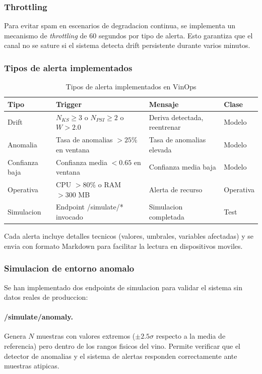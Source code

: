\subsubsection{Throttling}

Para evitar spam en escenarios de degradacion continua, se implementa un mecanismo de \textit{throttling} de 60 segundos por tipo de alerta. Esto garantiza que el canal no se sature si el sistema detecta drift persistente durante varios minutos.

\subsubsection{Tipos de alerta implementados}

\begin{table}[htbp]
\centering
\caption{Tipos de alerta implementados en VinOps}
\label{tab:alertas}
\begin{tabular}{@{}llp{5cm}l@{}}
\toprule
\textbf{Tipo} & \textbf{Trigger} & \textbf{Mensaje} & \textbf{Clase} \\
\midrule
Drift & $N_{KS} \geq 3$ o $N_{PSI} \geq 2$ o $W > 2.0$ & Deriva detectada, reentrenar & Modelo \\
Anomalia & Tasa de anomalias $> 25\%$ en ventana & Tasa de anomalias elevada & Modelo \\
Confianza baja & Confianza media $< 0.65$ en ventana & Confianza media baja & Modelo \\
Operativa & CPU $> 80\%$ o RAM $> 300$ MB & Alerta de recurso & Operativa \\
Simulacion & Endpoint /simulate/* invocado & Simulacion completada & Test \\
\bottomrule
\end{tabular}
\end{table}

Cada alerta incluye detalles tecnicos (valores, umbrales, variables afectadas) y se envia con formato Markdown para facilitar la lectura en dispositivos moviles.

\subsubsection{Simulacion de entorno anomalo}

Se han implementado dos endpoints de simulacion para validar el sistema sin datos reales de produccion:

\paragraph{/simulate/anomaly.} Genera $N$ muestras con valores extremos ($\pm 2.5\sigma$ respecto a la media de referencia) pero dentro de los rangos fisicos del vino. Permite verificar que el detector de anomalias y el sistema de alertas responden correctamente ante muestras atipicas.

